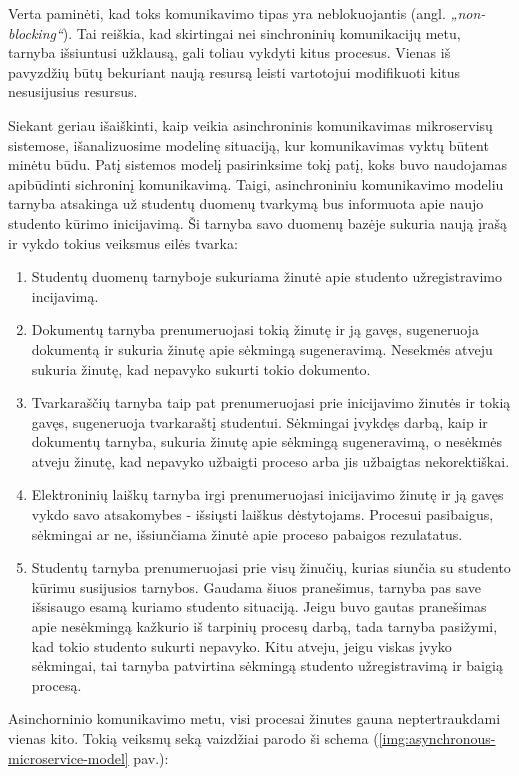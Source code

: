 Verta paminėti, kad toks komunikavimo tipas yra neblokuojantis (angl. \textit{„non-blocking“}). Tai reiškia, kad skirtingai nei sinchroninių
komunikacijų metu, tarnyba išsiuntusi užklausą, gali toliau vykdyti kitus procesus. Vienas iš pavyzdžių būtų bekuriant naują resursą leisti
vartotojui modifikuoti kitus nesusijusius resursus.

Siekant geriau išaiškinti, kaip veikia asinchroninis komunikavimas mikroservisų sistemose, išanalizuosime modelinę situaciją, kur komunikavimas vyktų būtent
minėtu būdu. Patį sistemos modelį pasirinksime tokį patį, koks buvo naudojamas apibūdinti sichroninį komunikavimą.
Taigi, asinchroniniu komunikavimo modeliu tarnyba atsakinga už studentų duomenų tvarkymą bus informuota apie naujo studento kūrimo inicijavimą.
Ši tarnyba savo duomenų bazėje sukuria naują įrašą ir vykdo tokius veiksmus eilės tvarka:

\begin{enumerate}
  \item Studentų duomenų tarnyboje sukuriama žinutė apie studento užregistravimo incijavimą.
  \item Dokumentų tarnyba prenumeruojasi tokią žinutę ir ją gavęs, sugeneruoja dokumentą ir sukuria žinutę apie
   sėkmingą sugeneravimą. Nesekmės atveju sukuria žinutę, kad nepavyko sukurti tokio dokumento.
  \item Tvarkaraščių tarnyba taip pat prenumeruojasi prie inicijavimo žinutės ir tokią gavęs, sugeneruoja tvarkaraštį studentui.
  Sėkmingai įvykdęs darbą, kaip ir dokumentų tarnyba, sukuria žinutę apie sėkmingą sugeneravimą, o nesėkmės atveju žinutę, kad nepavyko užbaigti proceso
  arba jis užbaigtas nekorektiškai.
  \item Elektroninių laiškų tarnyba irgi prenumeruojasi inicijavimo žinutę ir ją gavęs vykdo savo atsakomybes - išsiųsti laiškus dėstytojams.
  Procesui pasibaigus, sėkmingai ar ne, išsiunčiama žinutė apie proceso pabaigos rezulatatus.
  \item Studentų tarnyba prenumeruojasi prie visų žinučių, kurias siunčia su studento kūrimu susijusios tarnybos. Gaudama šiuos pranešimus, tarnyba pas save išsisaugo
  esamą kuriamo studento situaciją. Jeigu buvo gautas pranešimas apie nesėkmingą kažkurio iš tarpinių procesų darbą, tada tarnyba pasižymi, kad tokio studento sukurti nepavyko.
  Kitu atveju, jeigu viskas įvyko sėkmingai, tai tarnyba patvirtina sėkmingą studento užregistravimą ir baigią procesą. 
\end{enumerate}

Asinchorninio komunikavimo metu, visi procesai žinutes gauna neptertraukdami vienas kito. 
Tokią veiksmų seką vaizdžiai parodo ši schema (\ref{img:asynchronous-microservice-model} pav.):


